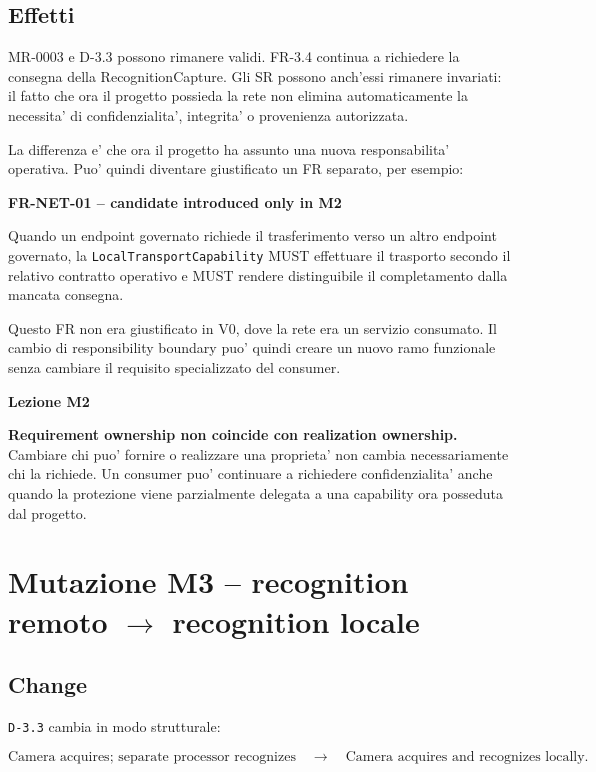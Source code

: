 \documentclass[11pt,a4paper]{article}
\newenvironment{statusbox}[1]{%
  \def\FrameCommand{\fcolorbox{ddtablue}{ddtagray}}%
  \MakeFramed{\advance\hsize-2\width\FrameRestore}
  \noindent\textbf{#1}\par\smallskip
}{\endMakeFramed}
\begin{document}
\subsection{Effetti}

MR-0003 e D-3.3 possono rimanere validi. FR-3.4 continua a richiedere la consegna della RecognitionCapture. Gli SR possono anch'essi rimanere invariati: il fatto che ora il progetto possieda la rete non elimina automaticamente la necessita' di confidenzialita', integrita' o provenienza autorizzata.

La differenza e' che ora il progetto ha assunto una nuova responsabilita' operativa. Puo' quindi diventare giustificato un FR separato, per esempio:

\begin{statusbox}{FR-NET-01 -- candidate introduced only in M2}
Quando un endpoint governato richiede il trasferimento verso un altro endpoint governato, la \texttt{LocalTransportCapability} MUST effettuare il trasporto secondo il relativo contratto operativo e MUST rendere distinguibile il completamento dalla mancata consegna.
\end{statusbox}

Questo FR non era giustificato in V0, dove la rete era un servizio consumato. Il cambio di responsibility boundary puo' quindi creare un nuovo ramo funzionale senza cambiare il requisito specializzato del consumer.

\begin{statusbox}{Lezione M2}
\textbf{Requirement ownership non coincide con realization ownership.} Cambiare chi puo' fornire o realizzare una proprieta' non cambia necessariamente chi la richiede. Un consumer puo' continuare a richiedere confidenzialita' anche quando la protezione viene parzialmente delegata a una capability ora posseduta dal progetto.
\end{statusbox}

\section{Mutazione M3 -- recognition remoto $\rightarrow$ recognition locale}

\subsection{Change}

\texttt{D-3.3} cambia in modo strutturale:

\[
\text{Camera acquires; separate processor recognizes}
\quad\longrightarrow\quad
\text{Camera acquires and recognizes locally}.
\]
\end{document}
